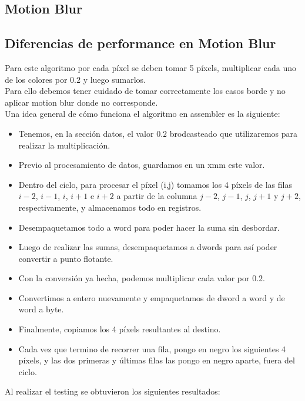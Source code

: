 \documentclass[a4paper]{article}
\begin{document}
\newpage
\subsection{Motion Blur}
\subsection{Diferencias de performance en Motion Blur}
Para este algoritmo por cada píxel se deben tomar 5 píxels, multiplicar cada uno de los colores por $0.2$ y luego sumarlos.
\\
Para ello debemos tener cuidado de tomar correctamente los casos borde y no aplicar motion blur donde no corresponde.
\\
Una idea general de cómo funciona el algoritmo en assembler es la siguiente:

\begin{itemize}
\item  Tenemos, en la sección datos, el valor $0.2$ brodcasteado que utilizaremos para realizar la multiplicación.
\item  Previo al procesamiento de datos, guardamos en un xmm este valor.
\item  Dentro del ciclo, para procesar el píxel (i,j) tomamos los 4 píxels de las filas $i-2$, $i-1$, $i$, $i+1$ e $i+2$ a partir de la columna $j-2$, $j-1$, $j$, $j+1$ y $j+2$, respectivamente, y almacenamos todo en registros.
\item  Desempaquetamos todo a word para poder hacer la suma sin desbordar.
\item  Luego de realizar las sumas, desempaquetamos a dwords para así poder convertir a punto flotante.
\item  Con la conversión ya hecha, podemos multiplicar cada valor por $0.2$.
\item  Convertimos a entero nuevamente y empaquetamos de dword a word y de word a byte.
\item  Finalmente, copiamos los 4 píxels resultantes al destino. 
\item  Cada vez que termino de recorrer una fila, pongo en negro los siguientes 4 píxels, y las dos primeras y últimas filas las pongo en negro aparte, fuera del ciclo.
\end{itemize}

Al realizar el testing se obtuvieron los siguientes resultados:
\end{document}
